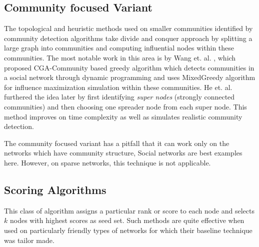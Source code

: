		\subsection{Community focused Variant}
		The topological and heuristic methods used on smaller communities identified by community detection algorithms take divide and conquer approach by splitting a large graph into communities and computing influential nodes within these communities. The most notable work in this area is by Wang et. al. \cite{wang2010}, which proposed CGA-Community based greedy algorithm which detects communities in a social network through dynamic programming and uses MixedGreedy algorithm \cite{chen2009} for influence maximization simulation within these communities. He et. al. \cite{he2015} furthered the idea later by first identifying \textit{super nodes} (strongly connected communities) and then choosing one spreader node from each super node. This method improves on time complexity as well as simulates realistic community detection.
		
		The community focused variant has a pitfall that it can work only on the networks which have community structure, Social networks are best examples here. However, on sparse networks, this technique is not applicable.
		
		\subsection{Scoring Algorithms}
		This class of algorithm assigns a particular rank or score to each node and selects $k$ nodes with highest scores as seed set. Such methods are quite effective when used on particularly friendly types of networks for which their baseline technique was tailor made.
		
